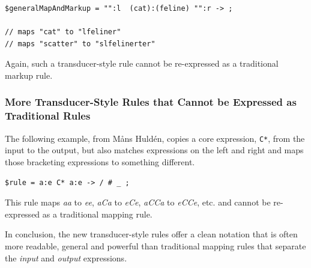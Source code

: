 \begin{Verbatim}
$generalMapAndMarkup = "":l  (cat):(feline) "":r -> ;

// maps "cat" to "lfeliner"
// maps "scatter" to "slfelinerter"
\end{Verbatim}

\noindent
Again, such a transducer-style rule cannot be re-expressed as a traditional markup rule.

\subsubsection{More Transducer-Style Rules that Cannot be Expressed as
Traditional Rules}

The following example, from M\r{a}ns Huldén, copies a core expression, \verb!C*!, from the
input to the output, but also matches expressions on the left and right and maps those
bracketing expressions to something different.

\begin{Verbatim}
$rule = a:e C* a:e -> / # _ ;
\end{Verbatim}

\noindent
This rule maps \emph{aa} to \emph{ee}, \emph{aCa} to \emph{eCe}, \emph{aCCa}
to \emph{eCCe}, etc. and cannot be re-expressed as a traditional mapping rule.

In conclusion, the new transducer-style rules offer a clean notation that is often more
readable, general and powerful than traditional mapping rules that separate the \emph{input}
and \emph{output} expressions.  
